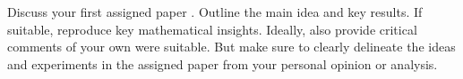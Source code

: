 Discuss your first assigned paper \cite{barocas-hardt-narayanan}. Outline the main idea and key results. If suitable, reproduce key mathematical insights. Ideally, also provide critical comments of your own were suitable. But make sure to clearly delineate the ideas and experiments in the assigned paper from your personal opinion or analysis.

